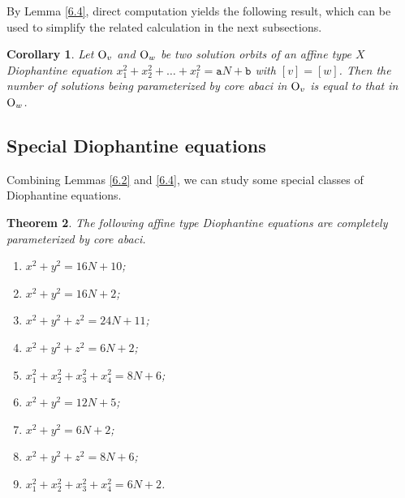 \documentclass[11pt]{amsart}
\theoremstyle{plain}
\numberwithin{equation}{subsection}
\newtheorem{theorem}{Theorem}[section]
\newtheorem{corollary}[theorem]{Corollary}
\begin{document}
By Lemma \ref{6.4}, direct computation yields the following result, which can be used to simplify the related calculation in the next subsections.

\begin{corollary}\label{6.5}
Let ${\rm O}_v$ and ${\rm O}_w$ be two solution orbits of an affine type $X$ 
Diophantine equation $x_1^2+x_2^2+\dots+x_l^2=\mathtt{a}N+\mathtt{b}$ with $[v]=[w]$.
Then the number of solutions being parameterized by core abaci in ${\rm O}_v$ is equal to that in ${\rm O}_w$.
\end{corollary}

\medskip


\subsection{Special Diophantine equations}

Combining Lemmas \ref{6.2} and \ref{6.4}, we can study some special classes of Diophantine equations.

\begin{theorem}\label{6.6}
The following affine type Diophantine equations are completely parameterized by core abaci.
\begin{enumerate}
  \item [{\rm(1)}] $x^2+y^2=16N+10$; 
  \item [{\rm(2)}] $x^2+y^2=16N+2$;
  \item [{\rm(3)}] $x^2+y^2+z^2=24N+11$; 
  \item [{\rm(4)}] $x^2+y^2+z^2=6N+2$;
  \item [{\rm(5)}] $x_1^2+x_2^2+x_3^2+x_4^2=8N+6$;
  \item [{\rm(6)}] $x^2+y^2=12N+5$; 
  \item [{\rm(7)}] $x^2+y^2=6N+2$; 
  \item [{\rm(8)}] $x^2+y^2+z^2=8N+6$; 
  \item [{\rm(9)}] $x_1^2+x_2^2+x_3^2+x_4^2=6N+2$.
\end{enumerate}
\end{theorem}
\end{document}
